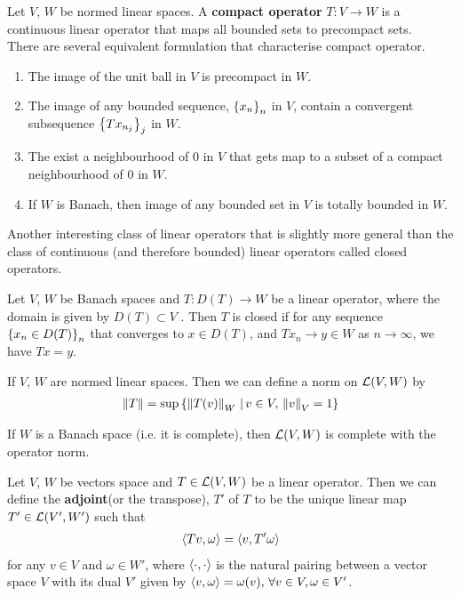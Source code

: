 \documentclass[12pt]{article}
\begin{document}
\begin{fdefinition} \label{def: compact operator}
    Let $V$, $W$ be normed linear spaces. A \textbf{compact operator} $T: V \to W$ is a continuous linear operator that maps all bounded sets to precompact sets. \\
    There are several equivalent formulation that characterise compact operator. 
    \begin{enumerate}
        \item The image of the unit ball in $V$ is precompact in $W$. 
        \item The image of any bounded sequence, $\set{x_n}_n$ in $V$, contain a convergent subsequence $\set{Tx_{n_j}}_j$ in $W$.
        \item The exist a neighbourhood of 0 in $V$ that gets map to a subset of a compact neighbourhood of 0 in $W$. 
        \item If $W$ is Banach, then image of any bounded set in $V$ is totally bounded in $W$. 
    \end{enumerate}
\end{fdefinition}


Another interesting class of linear operators that is slightly more general than the class of continuous (and therefore bounded) linear operators called closed operators. 
\begin{fdefinition} Let $V$, $W$ be Banach spaces and $T: D(T) \to W$ be a linear operator, where the domain is given by $D(T) \subset V$ . Then $T$ is closed if for any sequence $\set{x_n \in D(T)}_n$ that converges to $x \in D(T)$, and $Tx_n \to y \in W$ as $n \to \infty$, we have $Tx = y$. 
\end{fdefinition}

\begin{fdefinition} If $V$, $W$ are normed linear spaces. Then we can define a norm on $\L(V, W)$ by 
\begin{align*}
\norm[T] = \sup \set{ \norm[T(v)]_W \wh v \in V, \, \norm[v]_V = 1}
\end{align*}
\end{fdefinition}


\begin{ftheorem}[Completeness of $\L(V, W)$] If $W$ is a Banach space (i.e. it is complete), then $\L(V, W)$ is complete with the operator norm. 
\end{ftheorem}

\begin{fdefinition}[Adjoint] Let $V$, $W$ be vectors space and $T \in \L(V, W)$ be a linear operator. Then we can define the \textbf{adjoint}(or the transpose), $T'$ of $T$ to be the unique linear map $T' \in \L(V', W')$ such that 
\begin{align*}
\inprod[Tv, \omega] = \inprod[v, T'\omega]
\end{align*}
for any $v \in V$ and $\omega \in W'$, where $\inprod$ is the natural pairing between a vector space $V$ with its dual $V'$ given by $\inprod[v, \omega] = \omega(v), \, \forall v \in V, \omega \in V'$. 
\end{fdefinition}
\end{document}
